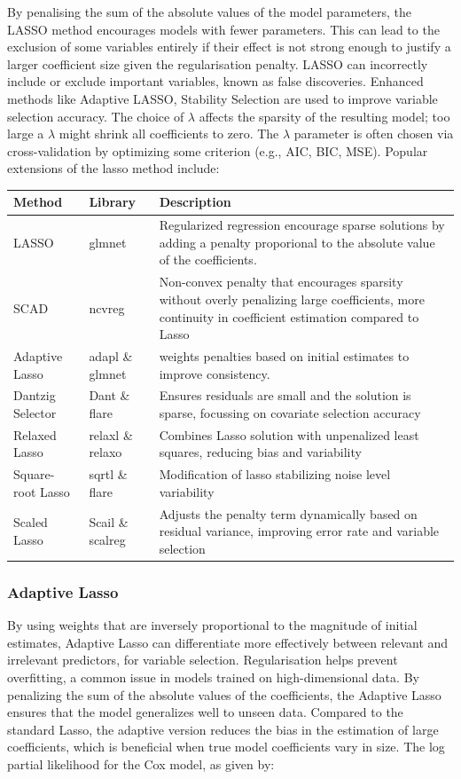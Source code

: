 \noindent By penalising the sum of the absolute values of the model parameters, the LASSO method encourages models with fewer parameters. This can lead to the exclusion of some variables entirely if their effect is not strong enough to justify a larger coefficient size given the regularisation penalty. LASSO can incorrectly include or exclude important variables, known as false discoveries. Enhanced methods like Adaptive LASSO, Stability Selection are used to improve variable selection accuracy. The choice of \(\lambda\) affects the sparsity of the resulting model; too large a \(\lambda\) might shrink all coefficients to zero. The \(\lambda\) parameter is often chosen via cross-validation by optimizing some criterion (e.g., AIC, BIC, MSE). \parencite{freijeirogonzalez_critical_2022}Popular extensions of the lasso method include:

\begin{tabularx}{\textwidth}{|X|X|X|}
	\hline
	Method & Library & Description \\
	\hline
	LASSO & glmnet & Regularized regression encourage sparse solutions by adding a penalty proporional to the absolute value of the coefficients. \\
	\hline
	SCAD & ncvreg & Non-convex penalty that encourages sparsity without overly penalizing large coefficients, more continuity in coefficient estimation compared to Lasso \\
	\hline
	Adaptive Lasso & adapl \& glmnet & weights penalties based on initial estimates to improve consistency. \\
	\hline
	Dantzig Selector & Dant \& flare & Ensures residuals are small and the solution is sparse, focussing on covariate selection accuracy \\
	\hline
	Relaxed Lasso & relaxl \& relaxo & Combines Lasso solution with unpenalized least squares, reducing bias and variability  \\
	\hline
	Square-root Lasso & sqrtl \& flare & Modification of lasso stabilizing noise level variability \\
	\hline
	Scaled Lasso & Scail \& scalreg & Adjusts the penalty term dynamically based on residual variance, improving error rate and variable selection \\
	\hline
\end{tabularx}
\subsubsection{Adaptive Lasso}
\noindent By using weights that are inversely proportional to the magnitude of initial estimates, \parencite{zhang_adaptive_2007} Adaptive Lasso can differentiate more effectively between relevant and irrelevant predictors, for variable selection. Regularisation helps prevent overfitting, a common issue in models trained on high-dimensional data. \parencite{zhang_adaptive_2007} By penalizing the sum of the absolute values of the coefficients, the Adaptive Lasso ensures that the model generalizes well to unseen data. Compared to the standard Lasso, the adaptive version reduces the bias in the estimation of large coefficients, which is beneficial when true model coefficients vary in size. The log partial likelihood for the Cox model, as given by:

